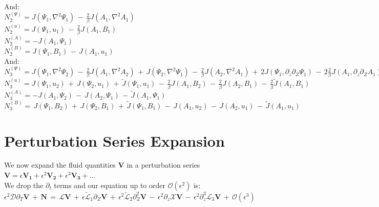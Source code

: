 \documentclass[letterpaper,12pt]{article}
\begin{document}
And: \\

$N_2^{(\Psi)} = J(\Psi_1, \nabla^2 \Psi_1) \,-\, \frac{2}{\beta}J(A_1, \nabla^2 A_1) $ \\

$N_2^{(u)} = J(\Psi_1, u_1) \, - \, \frac{2}{\beta} J(A_1, B_1) $ \\

$N_2^{(A)} = - J(A_1, \Psi_1)$ \\

$N_2^{(B)} =  J(\Psi_1, B_1) \, - \, J(A_1, u_1)$\\

And: \\

$N_3^{(\Psi)} = J(\Psi_1, \nabla^2\Psi_2) \, - \, \frac{2}{\beta}J(A_1, \nabla^2 A_2) \,+\, J(\Psi_2, \nabla^2\Psi_1) \, - \, \frac{2}{\beta}J(A_2, \nabla^2 A_1) \,+\, 2 J(\Psi_1, \partial_z\partial_Z \Psi_1) \, - \, 2 \frac{2}{\beta}J(A_1, \partial_z\partial_Z A_1) \,+\, \widetilde{J}(\Psi_1, \nabla^2 \Psi_1) \, - \,  \frac{2}{\beta}\widetilde{J}(A_1, \nabla^2 A_1) $ \\

$N_3^{(u)} = J(\Psi_1, u_2) \, + \, J(\Psi_2, u_1) \, + \, \widetilde{J}(\Psi_1, u_1) \, - \, \frac{2}{\beta} J(A_1, B_2) \, - \, \frac{2}{\beta} J(A_2, B_1) \, - \, \frac{2}{\beta} \widetilde{J}(A_1, B_1)$ \\

$N_3^{(A)} = - J(A_1, \Psi_2) \, - \, J(A_2, \Psi_1) \, - \, \widetilde{J}(A_1, \Psi_1) \,$ \\

$N_3^{(B)} = \, J(\Psi_1, B_2) \, + \, J(\Psi_2, B_1) \, + \, \widetilde{J}(\Psi_1, B_1) \, - \, J(A_1, u_2) \, - \,  J(A_2, u_1) \, - \, \widetilde{J}(A_1, u_1) \, $\\

\section*{Perturbation Series Expansion}

We now expand the fluid quantities $\mathbf{V}$ in a perturbation series $\mathbf{V} = \epsilon\mathbf{V_1} + \epsilon^2\mathbf{V_2} + \epsilon^3\mathbf{V_3} + ...$ \\

We drop the $\partial_t$ terms and our equation up to order $\mathcal{O}(\epsilon^2)$ is: \\

$\epsilon^2 \mathcal{D}\partial_T\mathbf{V} \, + \, \mathbf{N} \, = \, \mathcal{L}\mathbf{V} \, + \, \epsilon\widetilde{\mathcal{L}}_1\partial_Z\mathbf{V} \, + \, \epsilon^2\widetilde{\mathcal{L}}_2\partial_Z^2\mathbf{V} \, - \, \epsilon^2\partial_z\mathcal{X}\mathbf{V} \, - \, \epsilon^2\partial_z^3\mathcal{L}_3\mathbf{V} \, + \, \mathcal{O}(\epsilon^3)$ \\
\end{document}
